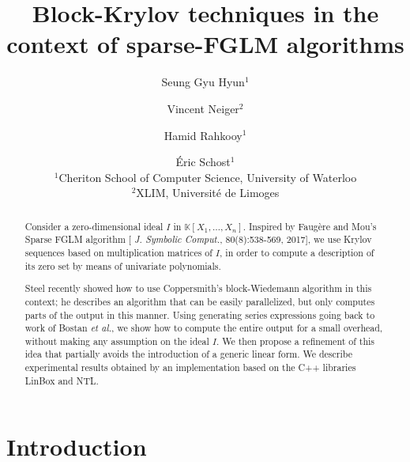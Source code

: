\documentclass[12pt]{article}
\title{Block-Krylov techniques in the context of sparse-FGLM algorithms}
\author{Seung Gyu Hyun$^1$ \and Vincent Neiger$^2$ \and Hamid Rahkooy$^1$ \and \'Eric Schost$^1$\\[3mm]
$^1$Cheriton School of Computer Science, University of Waterloo\\[2mm]
$^2$XLIM, Universit\'e de Limoges
}
\def\K{\mathbb{K}}
\def\K {\ensuremath{\mathbb{K}}}
\begin{document}
\maketitle

\begin{abstract}
  Consider a zero-dimensional ideal $I$ in $\K[X_1,\dots,X_n]$.
  Inspired by Faug\`ere and Mou's Sparse FGLM algorithm [{\em
      J. Symbolic Comput.}, 80(8):538-569, 2017], we use Krylov
  sequences based on multiplication matrices of $I$, in order to
  compute a description of its zero set by means of univariate
  polynomials.

  Steel recently showed how to use
  Coppersmith's block-Wiedemann algorithm in this context; he
  describes an algorithm that can be easily parallelized, but only
  computes parts of the output in this manner. Using generating series
  expressions going back to work of Bostan {\it et al.}, we show how
  to compute the entire output for a small overhead, without making
  any assumption on the ideal $I$. We then propose a refinement of this
  idea that partially avoids the introduction of a generic linear
  form.  We describe experimental results obtained by an
  implementation based on the C++ libraries LinBox and NTL.
\end{abstract}


\section{Introduction}
\end{document}
